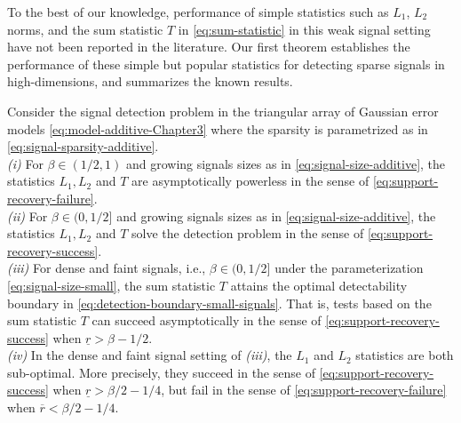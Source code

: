 To the best of our knowledge, performance of simple statistics such as $L_1$, $L_2$ norms, and 
the sum statistic $T$ in \eqref{eq:sum-statistic} in this weak signal setting have not been reported in the literature. %
Our first theorem establishes the performance of these simple but popular statistics for detecting sparse signals 
in high-dimensions, and summarizes the known results.

\begin{theorem} \label{thm:detection-optimality}
Consider the signal detection problem in the triangular array of Gaussian error models \eqref{eq:model-additive-Chapter3} where the sparsity is parametrized as in \eqref{eq:signal-sparsity-additive}.\\

{\em (i)}  For $\beta \in (1/2,1)$ and growing signals sizes as in \eqref{eq:signal-size-additive}, the statistics
    $L_1, L_2$ and $T$ are asymptotically powerless in the sense of \eqref{eq:support-recovery-failure}.\\
    
{\em (ii)} For $\beta \in (0,1/2]$ and growing signals sizes as in \eqref{eq:signal-size-additive}, the statistics
    $L_1, L_2$ and $T$ solve the detection problem in the sense of \eqref{eq:support-recovery-success}.\\
    
{\em (iii)} For dense and faint signals, i.e., $\beta \in (0,1/2]$ under the parameterization \eqref{eq:signal-size-small}, the sum statistic $T$
    attains the optimal detectability boundary in \eqref{eq:detection-boundary-small-signals}.  That is, tests based on the sum statistic $T$ can 
    succeed asymptotically in the sense of \eqref{eq:support-recovery-success} when $\underline{r}>\beta-1/2$.\\
     
 {\em (iv)} In the dense and faint signal setting of {\em (iii)}, the $L_1$ and $L_2$ statistics are both 
 sub-optimal. More precisely, they succeed in the sense of  \eqref{eq:support-recovery-success} when $\underline{r}>\beta/2-{1}/{4}$, but fail in the 
 sense of \eqref{eq:support-recovery-failure} when $\overline{r}<\beta/2-{1}/{4}$.
\end{theorem}


